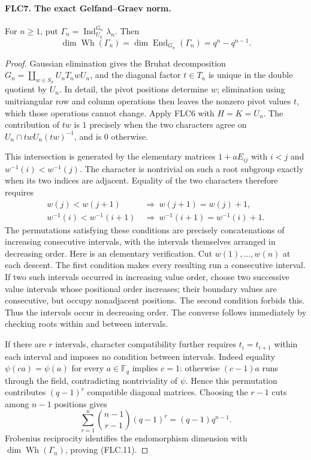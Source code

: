 \paragraph{FLC7. The exact Gelfand--Graev norm.}
\label{claim:FLC7}
For $n\ge1$, put $\Gamma_n=\operatorname{Ind}_{U_n}^{G_n}\lambda_n$.
Then
\[
 \dim\operatorname{Wh}(\Gamma_n)
       =\dim\operatorname{End}_{G_n}(\Gamma_n)
       =q^n-q^{n-1}.
 \tag{FLC.11}
\]
\begin{proof}
Gaussian elimination gives the Bruhat decomposition
$G_n=\coprod_{w\in S_n}U_n T_n w U_n$, and the diagonal factor
$t\in T_n$ is unique in the double quotient by $U_n$.
In detail, the pivot positions determine $w$; elimination using
unitriangular row and column operations then leaves the nonzero
pivot values $t$, which those operations cannot change.
Apply FLC6 with $H=K=U_n$.  The contribution of $tw$ is $1$
precisely when the two characters agree on
$U_n\cap twU_n(tw)^{-1}$, and is $0$ otherwise.

This intersection is generated by the elementary matrices
$1+aE_{ij}$ with $i<j$ and $w^{-1}(i)<w^{-1}(j)$.
The character is nontrivial on such a root subgroup exactly
when its two indices are adjacent.  Equality of the two
characters therefore requires
\[
 \begin{split}
 w(j)<w(j+1)&\ \Longrightarrow\ w(j+1)=w(j)+1,\\
 w^{-1}(i)<w^{-1}(i+1)&\ \Longrightarrow\
                  w^{-1}(i+1)=w^{-1}(i)+1.
 \end{split}
 \tag{FLC.12}
\]
The permutations satisfying these conditions are precisely
concatenations of increasing consecutive intervals, with the
intervals themselves arranged in decreasing order.
Here is an elementary verification.  Cut $w(1),\ldots,w(n)$
at each descent.  The first condition makes every resulting
run a consecutive interval.  If two such intervals occurred
in increasing value order, choose two successive value
intervals whose positional order increases; their boundary
values are consecutive, but occupy nonadjacent positions.
The second condition forbids this.  Thus the intervals occur
in decreasing order.  The converse follows immediately by
checking roots within and between intervals.

If there are $r$ intervals, character compatibility further
requires $t_i=t_{i+1}$ within each interval and imposes no
condition between intervals.  Indeed equality
$\psi(ca)=\psi(a)$ for every $a\in\mathbb F_q$ implies $c=1$:
otherwise $(c-1)a$ runs through the field, contradicting
nontriviality of $\psi$.  Hence this permutation contributes
$(q-1)^r$ compatible diagonal matrices.  Choosing the $r-1$
cuts among $n-1$ positions gives
\[
 \sum_{r=1}^n\binom{n-1}{r-1}(q-1)^r
                         =(q-1)q^{n-1}.
\]
Frobenius reciprocity identifies the endomorphism dimension
with $\dim\operatorname{Wh}(\Gamma_n)$, proving (FLC.11).
\end{proof}

